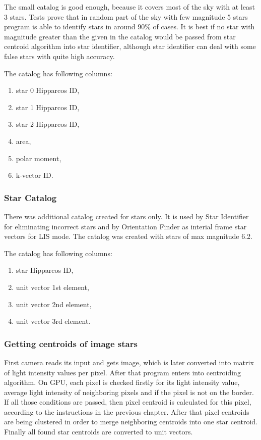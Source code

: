 \documentclass[12pt,a4paper,twoside]{article}
\begin{document}
The small catalog is good enough, because it covers most of the sky with at least 3 stars. Tests prove that in random part of the sky with few magnitude 5 stars program is able to identify stars in around 90\% of cases. It is best if no star with magnitude greater than the given in the catalog would be passed from star centroid algorithm into star identifier, although star identifier can deal with some false stars with quite high accuracy.

The catalog has following columns:
\begin{enumerate}[noitemsep]
\item star 0 Hipparcos ID, 
\item star 1 Hipparcos ID,
\item star 2 Hipparcos ID,
\item area,
\item polar moment,
\item k-vector ID.
\end{enumerate}

\subsubsection{Star Catalog}

There was additional catalog created for stars only. It is used by Star Identifier for eliminating incorrect stars and by Orientation Finder as interial frame star vectors for LIS mode. The catalog was created with stars of max magnitude 6.2.

The catalog has following columns:
\begin{enumerate}[noitemsep]
\item star Hipparcos ID,
\item unit vector 1st element,
\item unit vector 2nd element, 
\item unit vector 3rd element.
\end{enumerate}

\subsubsection{Getting centroids of image stars}

First camera reads its input and gets image, which is later converted into matrix of light intensity values per pixel. After that program enters into centroiding algorithm. On GPU, each pixel is checked firstly for its light intensity value, average light intensity of neighboring pixels and if the pixel is not on the border. If all those conditions are passed, then pixel centroid is calculated for this pixel, according to the instructions in the previous chapter. After that pixel centroids are being clustered in order to merge neighboring centroids into one star centroid. Finally all found star centroids are converted to unit vectors.
\end{document}
